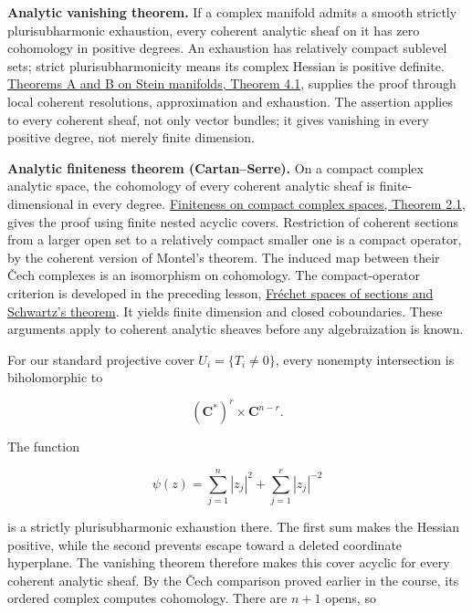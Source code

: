 \documentclass[11pt]{article}
\begin{document}
\textbf{Analytic vanishing theorem.} If a complex manifold admits a
smooth strictly plurisubharmonic exhaustion, every coherent analytic
sheaf on it has zero cohomology in positive degrees. An exhaustion has
relatively compact sublevel sets; strict plurisubharmonicity means its
complex Hessian is positive definite.
\href{../complex-analytic-spaces-and-coherent-sheaves/theorems-a-and-b-on-stein-manifolds.html\#4-theorem-b}{Theorems
A and B on Stein manifolds, Theorem 4.1}, supplies the proof through
local coherent resolutions, approximation and exhaustion. The assertion
applies to every coherent sheaf, not only vector bundles; it gives
vanishing in every positive degree, not merely finite dimension.

\textbf{Analytic finiteness theorem (Cartan--Serre).} On a compact
complex analytic space, the cohomology of every coherent analytic sheaf
is finite-dimensional in every degree.
\href{../complex-analytic-spaces-and-coherent-sheaves/finiteness-on-compact-complex-spaces.html\#2-the-finiteness-theorem}{Finiteness
on compact complex spaces, Theorem 2.1}, gives the proof using finite
nested acyclic covers. Restriction of coherent sections from a larger
open set to a relatively compact smaller one is a compact operator, by
the coherent version of Montel's theorem. The induced map between their
Čech complexes is an isomorphism on cohomology. The compact-operator
criterion is developed in the preceding lesson,
\href{../complex-analytic-spaces-and-coherent-sheaves/frechet-spaces-of-sections-and-schwartzs-theorem.html}{Fréchet
spaces of sections and Schwartz's theorem}. It yields finite dimension
and closed coboundaries. These arguments apply to coherent analytic
sheaves before any algebraization is known.

For our standard projective cover \(U_i=\{T_i\ne0\}\), every nonempty
intersection is biholomorphic to

\[
(\mathbf C^*)^r\times\mathbf C^{n-r}.
\]

The function

\[
\psi(z)=\sum_{j=1}^n|z_j|^2+\sum_{j=1}^r|z_j|^{-2}
\]

is a strictly plurisubharmonic exhaustion there. The first sum makes the
Hessian positive, while the second prevents escape toward a deleted
coordinate hyperplane. The vanishing theorem therefore makes this cover
acyclic for every coherent analytic sheaf. By the Čech comparison proved
earlier in the course, its ordered complex computes cohomology. There
are \(n+1\) opens, so
\end{document}
